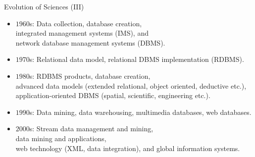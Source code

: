 \begin{frame}{Evolution of Sciences (III)}
	\begin{itemize}
		\item $1960$s: Data collection, database creation, \\
		      \hspace{1cm} integrated management systems (IMS), and \\
		      \hspace{1cm} network database management systems (DBMS).
		\item $1970$s: Relational data model, relational DBMS implementation
		      (RDBMS).
		\item $1980$s: RDBMS products, database creation, \\
		      \hspace{1cm} advanced data models (extended relational, object
		      oriented, deductive etc.),\\
		      \hspace{1cm} application-oriented DBMS (spatial, scientific,
		      engineering etc.).
		\item $1990$s: Data mining, data warehousing, multimedia databases, web
		      databases.
		\item $2000$s: Stream data management and mining,\\
		      \hspace{1cm} data mining and applications, \\
		      \hspace{1cm} web technology (XML, data integration), and global
		      information systems.
	\end{itemize}
\end{frame}
